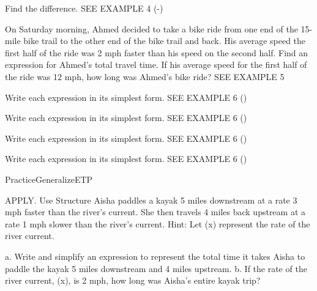\documentclass{article}
\newenvironment{practice}[2]{}{}        %
\newenvironment{te-addendum}[2]{}{}     %
\newcommand{\answer}[1]{}               %
\newcommand{\placeholder}[2]{}          %
\newcommand{\te}[1]{}                   %
\begin{document}
\begin{practice}{25}{1}
Find the difference. SEE EXAMPLE 4
(-)
\answer{(\frac{2y-14}{15(y+5)}) or (\frac{2(y-7)}{15(y+5)}).}
\end{practice}
\begin{practice}{26}{2}
On Saturday morning, Ahmed decided to take a bike ride from one end of the 15-mile bike trail to the other end of the bike trail and back. His average speed the first half of the ride was 2 mph faster than his speed on the second half. Find an expression for Ahmed's total travel time. If his average speed for the first half of the ride was 12 mph, how long was Ahmed's bike ride? SEE EXAMPLE 5
\placeholder{illustration}{Cyclist on a curving trail through green hills. Foreground rider travels right with callout Speed (x+2); faint returning rider in background has callout Speed (x). Central sign: Trail length 15 miles.}
\answer{(\frac{30(x+1)}{x(x+2)}); 2.75 hours.}
\end{practice}
\begin{practice}{27}{2}
Write each expression in its simplest form. SEE EXAMPLE 6
()
\answer{(\frac1{x-1})}
\end{practice}
\begin{practice}{28}{2}
Write each expression in its simplest form. SEE EXAMPLE 6
()
\answer{(\frac{3x+7y}{x-2y})}
\end{practice}
\begin{practice}{29}{2}
Write each expression in its simplest form. SEE EXAMPLE 6
()
\answer{(\frac1{a-b})}
\end{practice}
\begin{practice}{30}{2}
Write each expression in its simplest form. SEE EXAMPLE 6
()
\answer{(\frac{(z-4)(z-7)}{(z-5)(z+6)})}
\end{practice}
\begin{te-addendum}{Practice}{GeneralizeETP}
\te{Answers for Exercises 17--19 and 22--30 are printed here and transcribed with their items. Practice \& Problem Solving is available at SavvasRealize.com.}
\end{te-addendum}
\begin{practice}{31}{3}
APPLY. Use Structure Aisha paddles a kayak 5 miles downstream at a rate 3 mph faster than the river's current. She then travels 4 miles back upstream at a rate 1 mph slower than the river's current. Hint: Let (x) represent the rate of the river current.
\placeholder{illustration}{Person in yellow kayak paddling right through blue water. Callout: Kayak's downstream speed is (x+3) mph. A black left-pointing arrow at right is labeled Water current's speed is (x) mph.}
a. Write and simplify an expression to represent the total time it takes Aisha to paddle the kayak 5 miles downstream and 4 miles upstream.
b. If the rate of the river current, (x), is 2 mph, how long was Aisha's entire kayak trip?
\answer{a. (\frac{9x+7}{(x+3)(x-1)}). b. 5 h.}
\end{practice}
\end{document}
